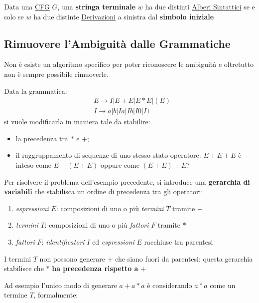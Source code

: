 \begin{theorem}{}{}
    Data una \hyperref[acro:cfg]{CFG} $G$, una \textbf{stringa terminale} $w$ ha due distinti \hyperref[def:alb-sint]{Alberi Sintattici} se e solo se $w$ ha due distinte \hyperref[rem:gram-derivazione]{Derivazioni} a sinistra dal \textbf{simbolo iniziale}
\end{theorem}
%
\subsection{Rimuovere l'Ambiguità dalle Grammatiche}\label{sub:ll_rimuovere_l_ambiguit_dalle_grammatiche} %
Non è esiste un algoritmo specifico per poter riconoscere le ambiguità e oltretutto non è sempre possibile rimuoverle.
\begin{example}{}{}
    Data la grammatica:
    \[
        \begin{aligned}
            &E\to I|E+E|E*E|(E) \\
            &I\to a|b|Ia|Ib|I0|I1
        \end{aligned}
    \]
    si vuole modificarla in maniera tale da stabilire:
    \begin{itemize}
        \item la precedenza tra $*$ e $+$;
        \item il raggruppamento di sequenze di uno stesso stato operatore: $E+E+E$ è inteso come $E+(E+E)$ oppure come $(E+E)+E$?
    \end{itemize}
\end{example}
Per risolvere il problema dell'esempio precedente, si introduce una \textbf{gerarchia di variabili} che stabilisca un ordine di precedenza tra gli operatori:
\begin{enumerate}
    \item \textit{espressioni} $E$: composizioni di uno o più \textit{termini} $T$ tramite $+$
    \item \textit{termini} $T$: composizioni di uno o più \textit{fattori} $F$ tramite $*$
    \item \textit{fattori} $F$: \textit{identificatori} $I$ ed \textit{espressioni} $E$ racchiuse tra parentesi
\end{enumerate}
\begin{note}
    I termini $T$ non possono generare $+$ che siano fuori da parentesi: questa gerarchia stabilisce che $*$ \textbf{ha precedenza rispetto a} $+$
\end{note}
Ad esempio l'unico modo di generare $a+a*a$ è considerando $a*a$ come un termine $T$, formalmente:
